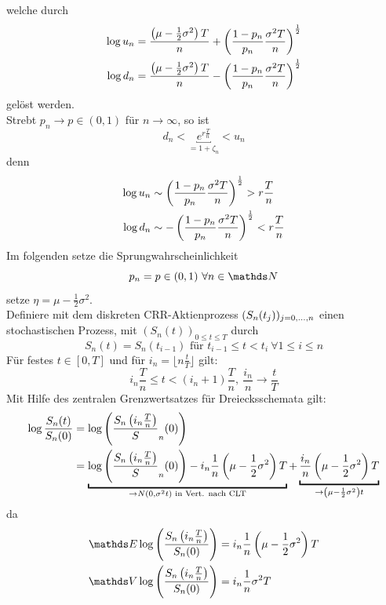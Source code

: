 welche durch
\begin{equation*}
\begin{aligned}
	\log u_n &= \frac{\left( \mu-\frac{1}{2}\sigma^2\right)T}{n}+\left( \frac{1-p_n}{p_n}\frac{\sigma^2T}{n}\right)^{\frac{1}{2}}\\
	\log d_n &= \frac{\left( \mu-\frac{1}{2}\sigma^2\right)T}{n}-\left( \frac{1-p_n}{p_n}\frac{\sigma^2T}{n}\right)^{\frac{1}{2}}
\end{aligned}
\end{equation*}
gelöst werden.\\
Strebt $p_n\to p\in (0,1)$ für $n\to \infty$, so ist
\[
d_n<\underbracket{e^{r\frac{T}{n}}}_{=1+\zeta_n}< u_n
\]
denn 
\begin{equation*}
\begin{aligned}
	\log u_n &\sim \left( \frac{1-p_n}{p_n}\frac{\sigma^2T}{n}\right)^{\frac{1}{2}}>r\frac{T}{n}\\
	\log d_n &\sim -\left( \frac{1-p_n}{p_n}\frac{\sigma^2T}{n}\right)^{\frac{1}{2}}<r\frac{T}{n}
\end{aligned}
\end{equation*}
Im folgenden setze die Sprungwahrscheinlichkeit
\[
p_n=p\in (0,1)~\forall n\in \N
\]
setze $\eta=\mu-\frac{1}{2}\sigma^2$.\\
Definiere mit dem diskreten CRR-Aktienprozess $(S_n(t_j))_{j=0, \dots ,n}$ einen stochastischen Prozess, mit $(S_n(t))_{0\le t\le T}$ durch
\[
S_n(t)=S_n(t_{i-1})\text{ für } t_{i-1}\le t<t_i~\forall 1\le i\le n
\]
Für festes $t\in[0,T]$ und für $i_n=\lfloor n\frac{t}{T}\rfloor$ gilt:
\[
i_n\frac{T}{n}\le t<(i_n+1)\frac{T}{n},~\frac{i_n}{n}\to \frac{t}{T}
\]
Mit Hilfe des zentralen Grenzwertsatzes für Dreiecksschemata gilt:
\begin{equation*}
\begin{aligned}
	\log\frac{S_n(t)}{S_n(0)} &= \log\enbrace{\frac{S_n\enbrace{i_n\frac{T}{n}}}S_n(0)}\\
	&=\underbracket{\log\enbrace{\frac{S_n\enbrace{i_n\frac{T}{n}}}S_n(0)}-i_n\frac{1}{n}\enbrace{\mu-\frac{1}{2}\sigma^2}T}_{\to N(0,\sigma^2t)\text{ in Vert. nach CLT}}+\underbracket{\frac{i_n}{n}\enbrace{\mu-\frac{1}{2}\sigma^2}T}_{\to \enbrace{\mu-\frac{1}{2}\sigma^2}t}
\end{aligned}
\end{equation*}
da
\begin{equation*}
\begin{aligned}
	\E\log\enbrace{\frac{S_n\enbrace{i_n\frac{T}{n}}}{S_n(0)}}&= i_n\frac{1}{n}\enbrace{\mu-\frac{1}{2}\sigma^2}T\\
	\V\log\enbrace{\frac{S_n\enbrace{i_n\frac{T}{n}}}{S_n(0)}}&= i_n\frac{1}{n}\sigma^2T
\end{aligned}
\end{equation*}
